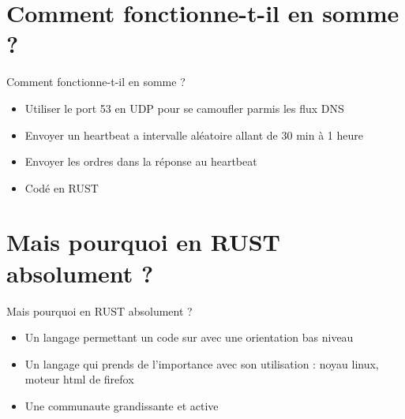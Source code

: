 \documentclass{beamer}
\begin{document}
\section{Comment fonctionne-t-il en somme ?}
  \begin{frame}{Comment fonctionne-t-il en somme ?}
  \begin{itemize}
	\item Utiliser le port 53 en UDP pour se camoufler parmis les flux DNS
	\item Envoyer un heartbeat a intervalle aléatoire allant de 30 min à 1 heure
	\item Envoyer les ordres dans la réponse au heartbeat
	\item Codé en RUST
  \end{itemize}
  \end{frame}

\section{Mais pourquoi en RUST absolument ?}
  \begin{frame}{Mais pourquoi en RUST absolument ?}
  \begin{itemize}
	\item Un langage permettant un code sur avec une orientation bas niveau
	\item Un langage qui prends de l'importance avec son utilisation : noyau linux, moteur html de firefox
	\item Une communaute grandissante et active
  \end{itemize}
  \end{frame}
\end{document}
